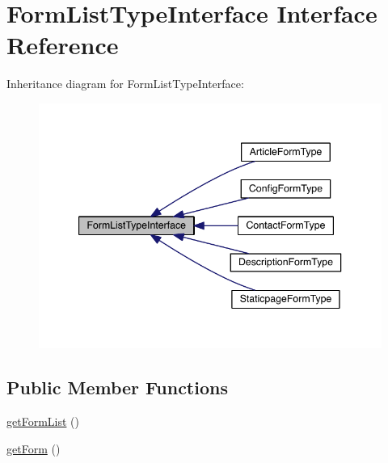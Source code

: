 \hypertarget{interfaceapp_1_1models_1_1core_1_1_form_1_1_form_list_type_interface}{\section{Form\-List\-Type\-Interface Interface Reference}
\label{interfaceapp_1_1models_1_1core_1_1_form_1_1_form_list_type_interface}
}


Inheritance diagram for Form\-List\-Type\-Interface\-:
\nopagebreak
\begin{figure}[H]
\begin{center}
\leavevmode
\includegraphics[width=344pt]{interfaceapp_1_1models_1_1core_1_1_form_1_1_form_list_type_interface__inherit__graph}
\end{center}
\end{figure}
\subsection*{Public Member Functions}
\begin{DoxyCompactItemize}
\item 
\hyperlink{interfaceapp_1_1models_1_1core_1_1_form_1_1_form_list_type_interface_ac43eaa53ae74ecad8ffee5da84508eed}{get\-Form\-List} ()
\item 
\hyperlink{interfaceapp_1_1models_1_1core_1_1_form_1_1_form_list_type_interface_a6aed11d79758a2d06062c8cd94bab221}{get\-Form} ()
\end{DoxyCompactItemize}


